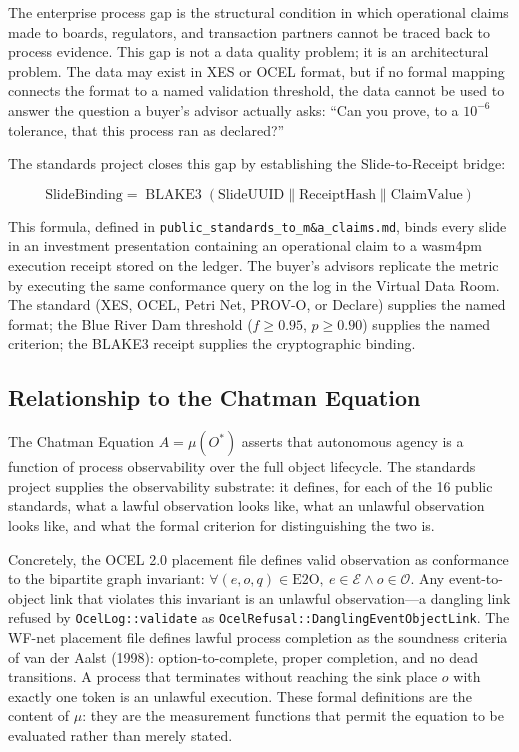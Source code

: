 The enterprise process gap is the structural condition in which operational claims made
to boards, regulators, and transaction partners cannot be traced back to process
evidence. This gap is not a data quality problem; it is an architectural problem. The
data may exist in XES or OCEL format, but if no formal mapping connects the format to
a named validation threshold, the data cannot be used to answer the question a buyer's
advisor actually asks: ``Can you prove, to a $10^{-6}$ tolerance, that this process ran
as declared?''

The standards project closes this gap by establishing the Slide-to-Receipt bridge:

\begin{equation}
  \text{SlideBinding} = \operatorname{BLAKE3}\!\left(
    \text{SlideUUID} \parallel \text{ReceiptHash} \parallel \text{ClaimValue}
  \right)
\end{equation}

This formula, defined in \texttt{public\_standards\_to\_m\&a\_claims.md}, binds every
slide in an investment presentation containing an operational claim to a wasm4pm execution
receipt stored on the ledger. The buyer's advisors replicate the metric by executing the
same conformance query on the log in the Virtual Data Room. The standard (XES, OCEL,
Petri Net, PROV-O, or Declare) supplies the named format; the Blue River Dam threshold
($f \ge 0.95$, $p \ge 0.90$) supplies the named criterion; the BLAKE3 receipt supplies
the cryptographic binding.

\subsection{Relationship to the Chatman Equation}
\label{sec:standards-lineage-chatman-equation}

The Chatman Equation $A = \mu(O^*)$ asserts that autonomous agency is a function of
process observability over the full object lifecycle. The standards project supplies the
observability substrate: it defines, for each of the 16 public standards, what a lawful
observation looks like, what an unlawful observation looks like, and what the formal
criterion for distinguishing the two is.

Concretely, the OCEL 2.0 placement file defines valid observation as conformance to the
bipartite graph invariant: $\forall (e, o, q) \in \text{E2O},\ e \in \mathcal{E} \land
o \in \mathcal{O}$. Any event-to-object link that violates this invariant is an unlawful
observation---a dangling link refused by \texttt{OcelLog::validate} as
\texttt{OcelRefusal::DanglingEventObjectLink}. The WF-net placement file defines lawful
process completion as the soundness criteria of van der Aalst (1998): option-to-complete,
proper completion, and no dead transitions. A process that terminates without reaching the
sink place $o$ with exactly one token is an unlawful execution. These formal definitions
are the content of $\mu$: they are the measurement functions that permit the equation to
be evaluated rather than merely stated.

